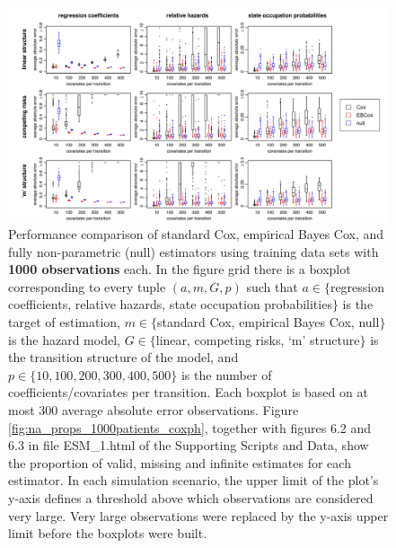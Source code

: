     
    \begin{figure}[h] 
    \centering         
    \includegraphics[width=14.5cm, angle=0]{figures/estimator_performance_boxplots_1000patients.pdf} %
    \vspace*{0.25cm}     %
    \caption{
    Performance comparison of standard Cox,  empirical Bayes Cox,  and fully non-parametric (null) estimators using training data sets with \textbf{1000 observations} each.  In the figure grid there is a boxplot corresponding to every tuple $(a,m, G, p)$ such that $a\in \lbrace$regression coefficients, relative hazards, state occupation probabilities$\rbrace$ is the target of estimation,  $m\in \lbrace$standard Cox, empirical Bayes Cox, null$\rbrace$ is the hazard model,  $G \in \lbrace$linear, competing risks, `m' structure$\rbrace$ is the transition structure of the model, and $p \in \lbrace 10,100,200,300,400,500 \rbrace$ is the number of coefficients/covariates per transition.  
    Each boxplot is based on at most 300 average absolute error observations. 
    Figure \ref{fig:na_props_1000patients_coxph}, together with figures 6.2 and 6.3 in file ESM\_1.html of the Supporting Scripts and Data, show the proportion of valid, missing and infinite estimates for each estimator. In each simulation scenario, the upper limit of the plot's y-axis  defines a threshold above which observations are considered very large. Very large observations were replaced by the y-axis upper limit before the boxplots were built. 
    }      
    \label{fig:estimator_performance_boxplots_1000patients} %
    \end{figure} 
    
